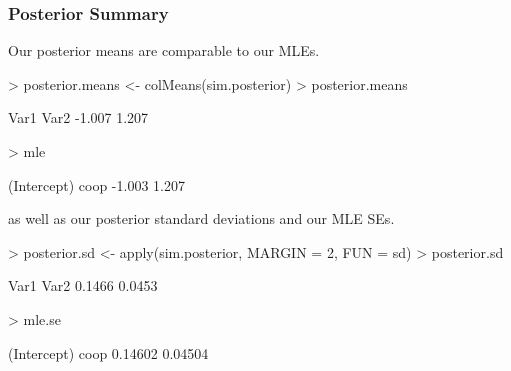 \documentclass{beamer}
\begin{document}
\begin{frame}[fragile]
\frametitle{Posterior Summary}
\pause
Our posterior means are comparable to our MLEs.
\medskip
\pause
\tiny
\begin{Schunk}
\begin{Sinput}
> posterior.means <- colMeans(sim.posterior)
> posterior.means
\end{Sinput}
\begin{Soutput}
  Var1   Var2 
-1.007  1.207 
\end{Soutput}
\begin{Sinput}
> mle
\end{Sinput}
\begin{Soutput}
(Intercept)        coop 
     -1.003       1.207 
\end{Soutput}
\end{Schunk}
\normalsize
\bigskip
\pause
as well as our posterior standard deviations and our MLE SEs.
\medskip
\pause
\tiny
\begin{Schunk}
\begin{Sinput}
> posterior.sd <- apply(sim.posterior, MARGIN = 2, FUN = sd)
> posterior.sd
\end{Sinput}
\begin{Soutput}
  Var1   Var2 
0.1466 0.0453 
\end{Soutput}
\begin{Sinput}
> mle.se
\end{Sinput}
\begin{Soutput}
(Intercept)        coop 
    0.14602     0.04504 
\end{Soutput}
\end{Schunk}
\end{frame}
\end{document}
